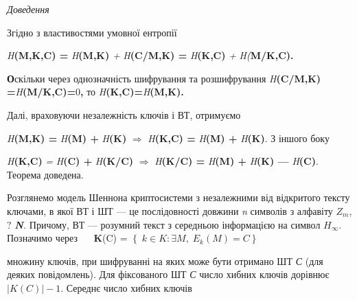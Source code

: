 {\itshape
Доведення }

\textit{ }Згідно\textit{ }з властивостями умовної ентропії 

\textit{H}\textbf{(}\textbf{M}\textbf{,}\textbf{K}\textbf{,}\textbf{C}\textbf{)
= }\textit{H}\textbf{(}\textbf{M}\textbf{,}\textbf{K}\textbf{) }\textit{+
}\textit{H}\textbf{(}\textbf{C}\textbf{/}\textbf{M}\textbf{,}\textbf{K}\textbf{)
= }\textit{H}\textbf{(}\textbf{K}\textbf{,}\textbf{C}\textbf{) }\textit{+
}\textit{H}\textit{(}\textbf{M}\textbf{/}\textbf{K}\textbf{,}\textbf{C}\textbf{).
}

\textbf{О}скільки через однозначність шифрування та розшифрування 
\textit{H}\textbf{(}\textbf{C}\textbf{/}\textbf{M}\textbf{,}\textbf{K}\textbf{)
=}\textit{H}\textbf{(}\textbf{M}\textbf{/}\textbf{K}\textbf{,}\textbf{C}\textbf{)=}0\textbf{,
}то\textbf{
}\textit{H}\textbf{(}\textbf{K}\textbf{,}\textbf{C}\textbf{)=}\textit{H}\textbf{(}\textbf{M}\textbf{,}\textbf{K}\textbf{)}\textbf{.}\textbf{
}

Далі, враховуючи незалежність ключів і ВТ, отримуємо  \textbf{ }

\textit{H}\textbf{(}\textbf{M}\textbf{,}\textbf{K}\textbf{) =
}\textit{H}\textbf{(}\textbf{M}\textbf{) +
}\textit{H}\textbf{(}\textbf{K}\textbf{) } $\Rightarrow $\textit{
}\textit{H}\textbf{(}\textbf{K}\textbf{,}\textbf{C}\textbf{) =
}\textit{H}\textbf{(}\textbf{M}\textbf{) +
}\textit{H}\textbf{(}\textbf{K}\textbf{)}. З іншого боку

\textit{H}\textbf{(}\textbf{K}\textbf{,}\textbf{C}\textbf{) }\textit{=
}\textit{H}\textbf{(}\textbf{C}\textbf{) +
}\textit{H}\textbf{(}\textbf{K}\textbf{/}\textbf{C}\textbf{) } ${\Rightarrow
}$\textbf{ }\textit{H}\textbf{(}\textbf{K}\textbf{/}\textbf{C}\textbf{) =
}\textit{H}\textbf{(}\textbf{M}\textbf{) +
}\textit{H}\textbf{(}\textbf{K}\textbf{) ---
}\textit{H}\textbf{(}\textbf{C}\textbf{)}.\textbf{ }Теорема\textbf{ }доведена.

Розглянемо модель Шеннона  криптосистеми  з незалежними  від відкритого тексту
ключами, в якої ВТ і ШТ --- це послідовності довжини  \textit{n}\textit{ }
символів з алфавіту   $Z_m$,  \textitn $?$\textit{
}\textbf{\textit{N}}\textit{.}  Причому,  ВТ --- розумний текст з середньою
інформацією на символ  $H_{\infty }$.  Позначимо  через   $ $   $ $ $ $ $ $
 \textbf{K}(C) =   ${\left\{\;k\in K:\exists
M,\;E_{k}\right.(M)=C\left.  \right\}}$

множину ключів, при шифруванні на яких  може бути отримано ШТ  \textit{С} (для
деяких повідомлень). Для фіксованого ШТ  \textit{С}  число хибних ключів
дорівнює   $|K(C)|-1$. Середнє число хибних ключів 


